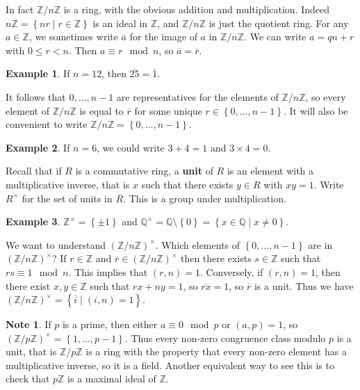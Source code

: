 \documentclass{article}
\newcommand{\Z}{\mathbb{Z}}
\newcommand{\Q}{\mathbb{Q}}
\newcommand{\rb}[1]{\left( #1 \right)}
\newcommand{\cb}[1]{\left\{ #1 \right\}}
\newcommand{\unit}[1]{\rb{\Z / #1\Z}^\times}
\theoremstyle{definition}\newtheorem{definition}{Definition}
\theoremstyle{definition}\newtheorem{remark}[definition]{Remark}
\theoremstyle{definition}\newtheorem*{example}{Example}
\theoremstyle{definition}\newtheorem*{note}{Note}
\begin{document}
In fact $ \Z / n\Z $ is a ring, with the obvious addition and multiplication. Indeed $ n\Z = \cb{nr \mid r \in \Z} $ is an ideal in $ \Z $, and $ \Z / n\Z $ is just the quotient ring. For any $ a \in \Z $, we sometimes write $ \overline{a} $ for the image of $ a $ in $ \Z / n\Z $. We can write $ a = qn + r $ with $ 0 \le r < n $. Then $ a \equiv r \mod n $, so $ \overline{a} = \overline{r} $.

\begin{example}
If $ n = 12 $, then $ \overline{25} = \overline{1} $.
\end{example}

It follows that $ 0, \dots, n - 1 $ are representatives for the elements of $ \Z / n\Z $, so every element of $ \Z / n\Z $ is equal to $ \overline{r} $ for some unique $ r \in \cb{0, \dots, n - 1} $. It will also be convenient to write $ \Z / n\Z = \cb{0, \dots, n - 1} $.

\begin{example}
If $ n = 6 $, we could write $ 3 + 4 = 1 $ and $ 3 \times 4 = 0 $.
\end{example}

Recall that if $ R $ is a commutative ring, a \textbf{unit} of $ R $ is an element with a multiplicative inverse, that is $ x $ such that there exists $ y \in R $ with $ xy = 1 $. Write $ R^\times $ for the set of units in $ R $. This is a group under multiplication.

\begin{example}
$ \Z^\times = \cb{\pm 1} $ and $ \Q^\times = \Q \setminus \cb{0} = \cb{x \in \Q \mid x \ne 0} $.
\end{example}

We want to understand $ \unit{n} $. Which elements of $ \cb{0, \dots, n - 1} $ are in $ \unit{n} $? If $ r \in \Z $ and $ \overline{r} \in \unit{n} $ then there exists $ s \in \Z $ such that $ rs \equiv 1 \mod n $. This implies that $ \rb{r, n} = 1 $. Conversely, if $ \rb{r, n} = 1 $, then there exist $ x, y \in \Z $ such that $ rx + ny = 1 $, so $ \overline{rx} = 1 $, so $ \overline{r} $ is a unit. Thus we have $ \unit{n} = \cb{\overline{i} \mid \rb{i, n} = 1} $.

\begin{note}
If $ p $ is a prime, then either $ a \equiv 0 \mod p $ or $ \rb{a, p} = 1 $, so $ \unit{p} = \cb{1, \dots, p - 1} $. Thus every non-zero congruence class modulo $ p $ is a unit, that is $ \Z / p\Z $ is a ring with the property that every non-zero element has a multiplicative inverse, so it is a field. Another equivalent way to see this is to check that $ p\Z $ is a maximal ideal of $ \Z $.
\end{note}
\end{document}
